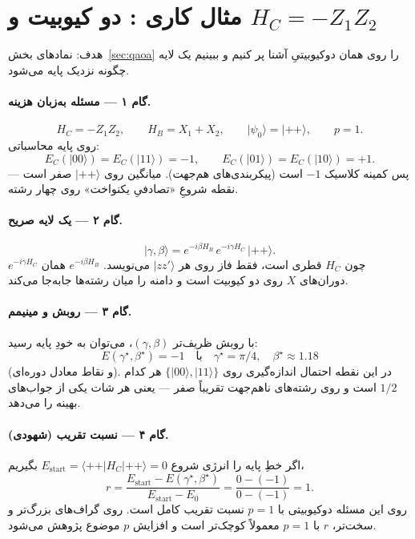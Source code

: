 \section{مثال کاری : دو کیوبیت و $H_C=-Z_1Z_2$}
\label{sec:qaoa-example}

هدف: نمادهای بخش~\ref{sec:qaoa} را روی همان  دوکیوبیتیِ آشنا پر کنیم و ببینیم یک لایه چگونه نزدیک پایه می‌شود.

\paragraph{گام ۱ --- مسئله به‌زبان هزینه.}
\begin{equation}
	H_C=-Z_1 Z_2,
	\qquad
	H_B=X_1+X_2,
	\qquad
	\lvert\psi_0\rangle=\lvert++\rangle,
	\qquad
	p=1.
\end{equation}
روی پایه محاسباتی:
\begin{equation}
	E_C(\lvert00\rangle)=E_C(\lvert11\rangle)=-1,
	\qquad
	E_C(\lvert01\rangle)=E_C(\lvert10\rangle)=+1.
\end{equation}
پس کمینه کلاسیک $-1$ است (پیکربندی‌های هم‌جهت). میانگین روی $\lvert++\rangle$ صفر است --- نقطه شروعِ «تصادفیِ یکنواخت» روی چهار رشته.

\paragraph{گام ۲ --- یک لایه صریح.}
\begin{equation}
	\lvert\gamma,\beta\rangle
	=
	e^{-i\beta H_B}\,
	e^{-i\gamma H_C}\,
	\lvert++\rangle.
\end{equation}
$e^{-i\gamma H_C}$ چون $H_C$ قطری است، فقط فاز روی هر $\lvert zz'\rangle$ می‌نویسد. $e^{-i\beta H_B}$ همان دوران‌های $X$ روی دو کیوبیت است و دامنه را میان رشته‌ها جابه‌جا می‌کند.

\paragraph{گام ۳ --- روبش و مینیمم.}
با روبش ظریف‌تر $(\gamma,\beta)$، می‌توان به خودِ پایه رسید:
\begin{equation}
	E(\gamma^\star,\beta^\star)=-1
	\quad\text{با}\quad
	\gamma^\star=\pi/4,
	\quad
	\beta^\star\approx 1.18
\end{equation}
(و نقاط معادل دوره‌ای). در این نقطه احتمال اندازه‌گیری روی $\{\lvert00\rangle,\lvert11\rangle\}$ هر کدام $1/2$ است و روی رشته‌های ناهم‌جهت تقریباً صفر --- یعنی هر شات یکی از جواب‌های بهینه را می‌دهد.

\paragraph{گام ۴ --- نسبت تقریب (شهودی).}
اگر خطِ پایه را انرژی شروع $E_{\mathrm{start}}=\langle++\rvert H_C\lvert++\rangle=0$ بگیریم،
\begin{equation}
	r
	=
	\frac{E_{\mathrm{start}}-E(\gamma^\star,\beta^\star)}{E_{\mathrm{start}}-E_0}
	=
	\frac{0-(-1)}{0-(-1)}
	=1.
\end{equation}
روی این مسئله دوکیوبیتی با $p=1$ نسبت تقریب کامل است. روی گراف‌های بزرگ‌تر و سخت‌تر، $r$ با $p=1$ معمولاً کوچک‌تر است و افزایش $p$ موضوع پژوهش می‌شود.

